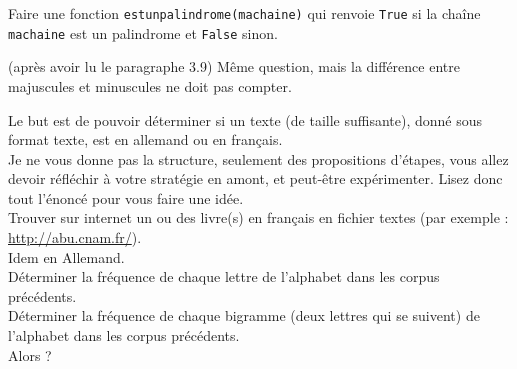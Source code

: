 \begin{enonce}
\ques Faire une fonction \texttt{estunpalindrome(machaine)} qui renvoie \texttt{True} si la chaîne \texttt{machaine} est un palindrome et \texttt{False} sinon.


\ques (après avoir lu le paragraphe 3.9) Même question, mais la différence entre majuscules et minuscules ne doit pas compter.


\exo

\begin{enonce}

Le but est de pouvoir   déterminer si un texte (de taille suffisante),  donné sous format texte, est en allemand ou en français.
\\

Je ne vous donne pas la structure, seulement des propositions d'étapes,  vous allez devoir  réfléchir  à votre stratégie en amont, et peut-être expérimenter. Lisez donc tout l'énoncé pour vous faire une idée.\\


\nipuce  Trouver sur internet un ou des livre(s) en français en fichier textes (par exemple : \href{http://abu.cnam.fr/} {http://abu.cnam.fr/}).\\

\nipuce  Idem en Allemand.\\

\nipuce Déterminer la fréquence de chaque lettre de l'alphabet dans les corpus précédents.\\

\nipuce Déterminer la fréquence de chaque bigramme (deux lettres qui se suivent) de l'alphabet dans les corpus précédents.\\

\nipuce  Alors ?

\end{enonce}

\begin{correction}

\end{correction}



\end{enonce}

\begin{correction}

\end{correction}


